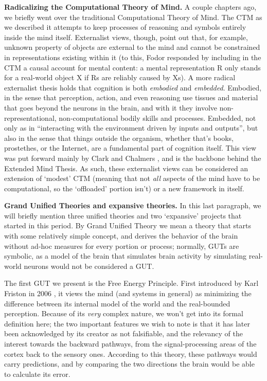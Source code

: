\documentclass[../main.tex]{subfiles}
\begin{document}
\vspace{4pt}
\textbf{Radicalizing the Computational Theory of Mind.} A couple chapters ago, we briefly went over the traditional Computational Theory of Mind. The CTM as we described it attempts to keep processes of reasoning and symbols entirely inside the mind itself. Externalist views, though, point out that, for example, unknown property of objects are external to the mind and cannot be constrained in representations existing within it (to this, Fodor responded by including in the CTM a causal account for mental content: a mental representation R only stands for a real-world object X if Rs are reliably caused by Xs). A more radical externalist thesis holds that cognition is both \textit{embodied} and \textit{embedded}. Embodied, in the sense that perception, action, and even reasoning use tissues and material that goes beyond the neurons in the brain, and with it they involve non-representational, non-computational bodily skills and processes. Embedded, not only as in ``interacting with the environment driven by inputs and outputs'', but also in the sense that things outside the organism, whether that's books, prostethes, or the Internet, are a fundamental part of cognition itself. This view was put forward mainly by Clark \parencite{clarkNaturalbornCyborgsMinds2003} and Chalmers \parencite{clarkExtendedMind1998b}, and is the backbone behind the Extended Mind Thesis. As such, these externalist views can be considered an extension of `modest' CTM (meaning that not \textit{all} aspects of the mind have to be computational, so the `offloaded' portion isn't) or a new framework in itself.

\vspace{4pt}
\textbf{Grand Unified Theories and expansive theories.}
In this last paragraph, we will briefly mention three unified theories and two `expansive' projects that started in this period. By Grand Unified Theory we mean a theory that starts with some relatively simple concept, and derives the behavior of the brain without ad-hoc measures for every portion or process; normally, GUTs are symbolic, as a model of the brain that simulates brain activity by simulating real-world neurons would not be considered a GUT.

The first GUT we present is the Free Energy Principle. First introduced by Karl Friston in 2006 \parencite{fristonFreeEnergyPrinciple2006}, it views the mind (and systems in general) as minimizing the difference between its internal model of the world and the real-bounded perception. Because of its \textit{very} complex nature, we won't get into its formal definition here; the two important features we wish to note is that it has later been acknowledged by its creator as not falsifiable, and the relevancy of the interest towards the backward pathways, from the signal-processing areas of the cortex back to the sensory ones. According to this theory, these pathways would carry predictions, and by comparing the two directions the brain would be able to calculate its error.
\end{document}
